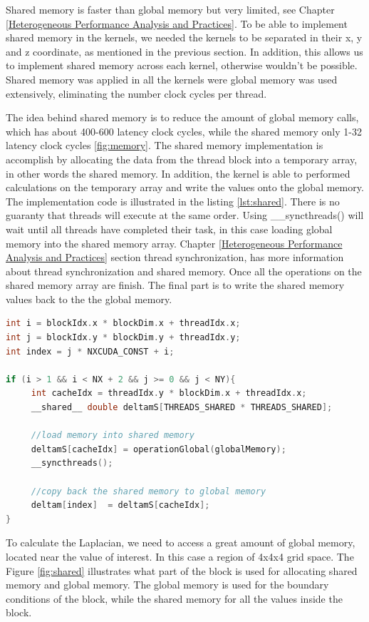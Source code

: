 Shared memory is faster than global memory but very limited, see Chapter \ref{Heterogeneous Performance Analysis and Practices}. To be able to implement shared memory in the kernels, we needed the kernels to be separated in their x, y and z coordinate, as mentioned in the previous section. In addition, this allows us to implement shared memory across each kernel, otherwise wouldn't be possible. Shared memory was applied in all the kernels were global memory was used extensively, eliminating the number clock cycles per thread.

The idea behind shared memory is to reduce the amount of global memory calls, which has about 400-600 latency clock cycles, while the shared memory only 1-32 latency clock cycles \ref{fig:memory}. The shared memory implementation is accomplish by allocating the data from the thread block into a temporary array, in other words the shared memory. In addition, the kernel is able to performed calculations on the temporary array and write the values onto the global memory. The implementation code is illustrated in the listing \ref{lst:shared}. There is no guaranty that threads will execute at the same order. Using {\listf \_\_syncthreads()} will wait until all threads have completed their task, in this case loading global memory into the shared memory array. Chapter \ref{Heterogeneous Performance Analysis and Practices} section thread synchronization, has more information about thread synchronization and shared memory. Once all the operations on the shared memory array are finish. The final part is to write the shared memory values back to the the global memory.

\begin{lstlisting}[language=C++, label={lst:shared}, caption={Shared memory}]
int i = blockIdx.x * blockDim.x + threadIdx.x;
int j = blockIdx.y * blockDim.y + threadIdx.y;
int index = j * NXCUDA_CONST + i;

if (i > 1 && i < NX + 2 && j >= 0 && j < NY){
     int cacheIdx = threadIdx.y * blockDim.x + threadIdx.x;
     __shared__ double deltamS[THREADS_SHARED * THREADS_SHARED];

	 //load memory into shared memory
     deltamS[cacheIdx] = operationGlobal(globalMemory);
     __syncthreads();

	 //copy back the shared memory to global memory
     deltam[index]  = deltamS[cacheIdx];
}
\end{lstlisting}

To calculate the Laplacian, we need to access a great amount of global memory, located near the value of interest. In this case a region of 4x4x4 grid space. The Figure \ref{fig:shared} illustrates what part of the block is used for allocating shared memory and global memory. The global memory is used for the boundary conditions of the block, while the shared memory for all the values inside the block.

